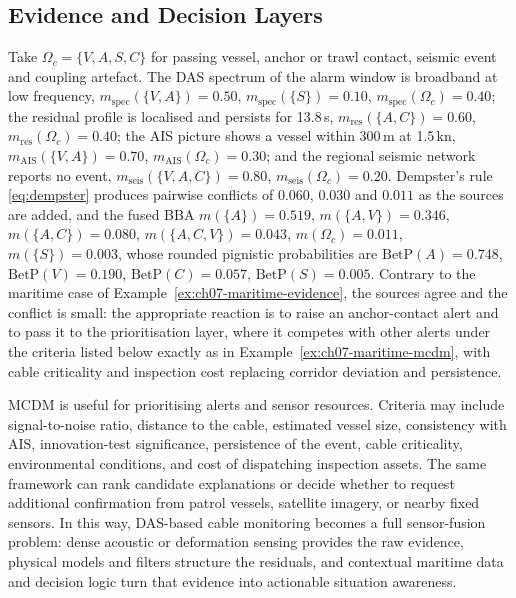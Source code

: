 \subsection{Evidence and Decision Layers}
\label{subsec:cable-evidence-decision}
\begin{example}
\label{ex:ch07-cable-evidence}
Take $\Omega_c=\{V,A,S,C\}$ for passing vessel, anchor or trawl contact, seismic event and coupling artefact. The DAS spectrum of the alarm window is broadband at low frequency, $m_{\mathrm{spec}}(\{V,A\})=0.50$, $m_{\mathrm{spec}}(\{S\})=0.10$, $m_{\mathrm{spec}}(\Omega_c)=0.40$; the residual profile is localised and persists for 13.8\,s, $m_{\mathrm{res}}(\{A,C\})=0.60$, $m_{\mathrm{res}}(\Omega_c)=0.40$; the AIS picture shows a vessel within 300\,m at 1.5\,kn, $m_{\mathrm{AIS}}(\{V,A\})=0.70$, $m_{\mathrm{AIS}}(\Omega_c)=0.30$; and the regional seismic network reports no event, $m_{\mathrm{seis}}(\{V,A,C\})=0.80$, $m_{\mathrm{seis}}(\Omega_c)=0.20$. Dempster's rule \eqref{eq:dempster} produces pairwise conflicts of $0.060$, $0.030$ and $0.011$ as the sources are added, and the fused BBA $m(\{A\})=0.519$, $m(\{A,V\})=0.346$, $m(\{A,C\})=0.080$, $m(\{A,C,V\})=0.043$, $m(\Omega_c)=0.011$, $m(\{S\})=0.003$, whose rounded pignistic probabilities are $\mathrm{BetP}(A)=0.748$, $\mathrm{BetP}(V)=0.190$, $\mathrm{BetP}(C)=0.057$, $\mathrm{BetP}(S)=0.005$. Contrary to the maritime case of Example~\ref{ex:ch07-maritime-evidence}, the sources agree and the conflict is small: the appropriate reaction is to raise an anchor-contact alert and to pass it to the prioritisation layer, where it competes with other alerts under the criteria listed below exactly as in Example~\ref{ex:ch07-maritime-mcdm}, with cable criticality and inspection cost replacing corridor deviation and persistence.
\end{example}


MCDM is useful for prioritising alerts and sensor resources. Criteria may include signal-to-noise ratio, distance to the cable, estimated vessel size, consistency with AIS, innovation-test significance, persistence of the event, cable criticality, environmental conditions, and cost of dispatching inspection assets. The same framework can rank candidate explanations or decide whether to request additional confirmation from patrol vessels, satellite imagery, or nearby fixed sensors. In this way, DAS-based cable monitoring becomes a full sensor-fusion problem: dense acoustic or deformation sensing provides the raw evidence, physical models and filters structure the residuals, and contextual maritime data and decision logic turn that evidence into actionable situation awareness.

